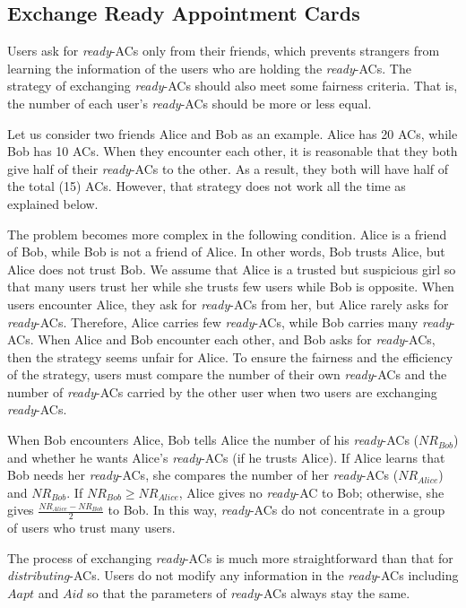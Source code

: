 \subsection{Exchange Ready Appointment Cards}

\noindent Users ask for \textit{ready}-ACs only from their friends, which prevents strangers from learning the information of the users who are holding the \textit{ready}-ACs. The strategy of exchanging \textit{ready}-ACs should also meet some fairness criteria. That is, the number of each user's \textit{ready}-ACs should be more or less equal. 

Let us consider two friends Alice and Bob as an example. Alice has 20 ACs, while Bob has 10 ACs. When they encounter each other, it is reasonable that they both give half of their \textit{ready}-ACs to the other. As a result, they both will have half of the total (15) ACs. However, that strategy does not work all the time as explained below.

The problem becomes more complex in the following condition. Alice is a friend of Bob, while Bob is not a friend of Alice. In other words, Bob trusts Alice, but Alice does not trust Bob. We assume that Alice is a trusted but suspicious girl so that many users trust her while she trusts few users while Bob is opposite. When users encounter Alice, they ask for \textit{ready}-ACs from her, but Alice rarely asks for \textit{ready}-ACs. Therefore, Alice carries few \textit{ready}-ACs, while Bob carries many \textit{ready}-ACs. When Alice and Bob encounter each other, and Bob asks for \textit{ready}-ACs, then the strategy seems unfair for Alice. To ensure the fairness and the efficiency of the strategy, users must compare the number of their own \textit{ready}-ACs and the number of \textit{ready}-ACs carried by the other user when two users are exchanging \textit{ready}-ACs.

When Bob encounters Alice, Bob tells Alice the number of his \textit{ready}-ACs (${NR}_{Bob}$) and whether he wants Alice's \textit{ready}-ACs (if he trusts Alice). If Alice learns that Bob needs her \textit{ready}-ACs, she compares the number of her \textit{ready}-ACs (${NR}_{Alice}$) and ${NR}_{Bob}$. If ${NR}_{Bob}\ge {NR}_{Alice}$, Alice gives no \textit{ready}-AC to Bob; otherwise, she gives $\frac{{NR}_{Alice}-{NR}_{Bob}}{2}$ to Bob. In this way, \textit{ready}-ACs do not concentrate in a group of users who trust many users. 

The process of exchanging \textit{ready}-ACs is much more straightforward than that for \textit{distributing}-ACs. Users do not modify any information in the \textit{ready}-ACs including $Aapt$ and $Aid$ so that the parameters of \textit{ready}-ACs always stay the same.

